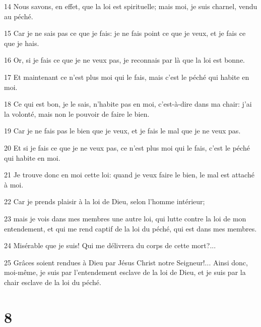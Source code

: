\par 14 Nous savons, en effet, que la loi est spirituelle; mais moi, je suis charnel, vendu au péché.
\par 15 Car je ne sais pas ce que je fais: je ne fais point ce que je veux, et je fais ce que je hais.
\par 16 Or, si je fais ce que je ne veux pas, je reconnais par là que la loi est bonne.
\par 17 Et maintenant ce n'est plus moi qui le fais, mais c'est le péché qui habite en moi.
\par 18 Ce qui est bon, je le sais, n'habite pas en moi, c'est-à-dire dans ma chair: j'ai la volonté, mais non le pouvoir de faire le bien.
\par 19 Car je ne fais pas le bien que je veux, et je fais le mal que je ne veux pas.
\par 20 Et si je fais ce que je ne veux pas, ce n'est plus moi qui le fais, c'est le péché qui habite en moi.
\par 21 Je trouve donc en moi cette loi: quand je veux faire le bien, le mal est attaché à moi.
\par 22 Car je prends plaisir à la loi de Dieu, selon l'homme intérieur;
\par 23 mais je vois dans mes membres une autre loi, qui lutte contre la loi de mon entendement, et qui me rend captif de la loi du péché, qui est dans mes membres.
\par 24 Misérable que je suis! Qui me délivrera du corps de cette mort?...
\par 25 Grâces soient rendues à Dieu par Jésus Christ notre Seigneur!... Ainsi donc, moi-même, je suis par l'entendement esclave de la loi de Dieu, et je suis par la chair esclave de la loi du péché.

\chapter{8}

